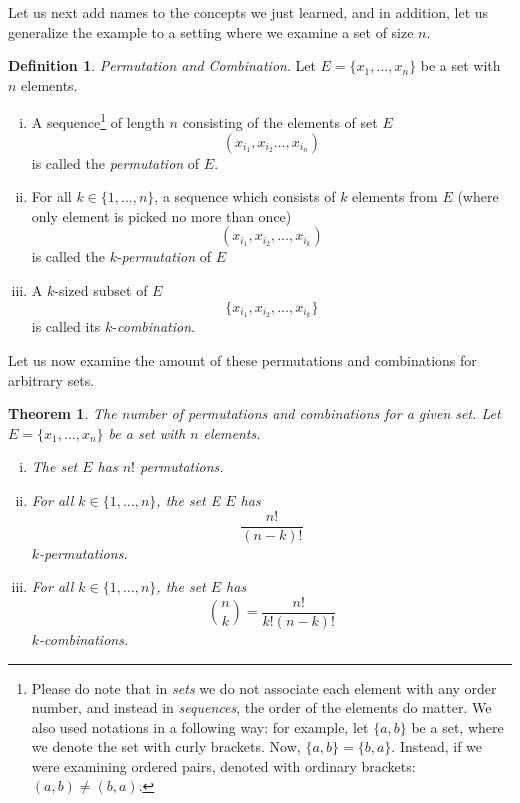 \documentclass[12pt,a4paper,leqno]{report}
\theoremstyle{plain}
\newtheorem{lause}[equation]{Theorem}
\theoremstyle{definition}
\newtheorem{maar}[equation]{Definition}
\begin{document}
Let us next add names to the concepts we just learned, and in addition, let us generalize the example to a setting where we examine a set of size $n$.

\begin{maar} \emph{Permutation and Combination}. Let $E = \{x_1 , \dots , x_n\}$ be a set with $n$ elements.
\begin{enumerate}[(i)]
\item A sequence\footnote{Please do note that in \emph{sets} we do not associate each element with any order number, and instead in \emph{sequences}, the order of the elements do matter. We also used notations in a following way: for example, let $\{a,b\}$ be a set, where we denote the set with curly brackets. Now, $\{a,b\}=\{b,a\}$. Instead, if we were examining ordered pairs, denoted with ordinary brackets: $(a,b) \neq (b,a)$.} of length $n$ consisting of the elements of set $E$
\[
(x_{i_1}, x_{i_2} \dots , x_{i_n})
\]
is called the \emph{permutation} of $E$.

\item For all $k \in \{1, \dots , n\}$, a sequence which consists of $k$ elements from $E$ (where only element is picked no more than once)
\[
(x_{i_1}, x_{i_2}, \dots ,x_{i_k})
\]
is called the $k$-\emph{permutation} of $E$

\item A $k$-sized subset of $E$ 
\[
\{x_{i_1}, x_{i_2}, \dots , x_{i_k}\}
\]
is called its $k$-\emph{combination}. 
\end{enumerate}
\end{maar}

Let us now examine the amount of these permutations and combinations for arbitrary sets.

\begin{lause}
\label{lause:combinations}
The number of permutations and combinations for a given set. Let $E = \{x_1 , \dots , x_n\}$ be a set with $n$ elements.
\begin{enumerate}[(i)]
\item The set $E$ has $n!$
permutations.

\item For all $k \in \{1, \dots , n\}$, the set E $E$ has 
\[
\frac{n!}{(n-k)!}
\] 
$k$-permutations.

\item For all $k \in \{1, \dots , n\}$, the set $E$ has 
\[
\binom{n}{k} = \frac{n!}{k!(n-k)!}
\]
$k$-combinations. 
\end{enumerate}
\end{lause}
\end{document}
